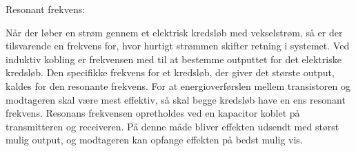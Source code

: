 Resonant frekvens:

Når der løber en strøm gennem et elektrisk kredsløb med vekselstrøm, så er der tilsvarende en frekvens for, hvor hurtigt strømmen skifter retning i systemet. Ved induktiv kobling er frekvensen med til at bestemme outputtet for det elektriske kredsløb. Den specifikke frekvens for et kredsløb, der giver det største output, kaldes for den resonante frekvens. For at energioverførslen mellem transistoren og modtageren skal være mest effektiv, så skal begge kredsløb have en ens resonant frekvens. Resonans frekvensen opretholdes ved en kapacitor koblet på transmitteren og receiveren. På denne måde bliver effekten udsendt med størst mulig output, og modtageren kan opfange effekten på bedst mulig vis.